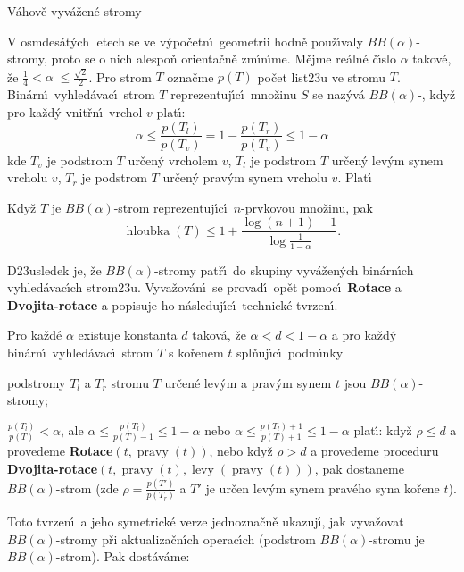 \documentclass[a4paper,12pt]{article}
\def \emph#1{\underbar{#1}}
\DeclareMathOperator*{\levy}{levy}
\DeclareMathOperator*{\pravy}{pravy}
\DeclareMathOperator*{\hloubka}{hloubka}
\begin{document}
\heading
V\'ahov\v e vyv\'a\v zen\'e stromy
\endheading

\flushpar V osmdes\'at\'ych letech se ve v\'ypo\v cetn\'\i\ geometrii 
hodn\v e pou\v z\'\i\-va\-ly $BB(\alpha )$-stromy, proto se o nich alespo\v n 
orienta\v cn\v e zm\'\i n\'\i me. M\v ejme re\'aln\'e \v c\'\i slo $
\alpha$ takov\'e, \v ze 
$\frac 14<\alpha\;\le\frac {\sqrt 2}2$. Pro strom $T$ ozna\v cme $
p(T)$ po\v cet 
list\accent23u ve stromu $T$. Bin\'arn\'\i\ vyhled\'avac\'\i\ strom $T$ 
reprezentuj\'\i c\'\i\ mno\v zinu $S$ se naz\'yv\'a $BB(\alpha )$-\emph{strom}, 
kdy\v z pro ka\v zd\'y vnit\v rn\'\i\ vrchol $v$ plat\'\i :
$$\alpha\le\frac {p(T_l)}{p (T_v)}=1-\frac {p(T_r)}{p(T_v)}\le 1-\alpha$$
kde $T_v$ je podstrom $T$ ur\v cen\'y vrcholem $v$, $T_l$ je podstrom 
$T$ ur\v cen\'y lev\'ym synem vrcholu $v$, $T_r$ je podstrom $T$ 
ur\v cen\'y prav\'ym synem vrcholu $v$. Plat\'\i


Kdy\v z $T$ je $BB(\alpha )$-strom reprezentuj\'\i c\'\i\ 
$n$-prvkovou mno\v zinu, pak 
$$\hloubka(T)\le 1+\frac {\log(n+1)-1}{\log\frac 1{1-\alpha}}.$$
\endproclaim

\flushpar D\accent23usledek je, \v ze $BB(\alpha )$-stromy pat\v r\'\i\ do 
skupiny vyv\'a\v zen\'ych bin\'arn\'\i ch vyhled\'avac\'\i ch 
stro\-m\accent23u.  Vyva\v zov\'an\'\i\ se provad\'\i\ op\v et pomoc\'\i\ 
{\bf Rotace} a {\bf Dvojita-rotace} a popisuje ho n\'asledu\-j\'\i\-c\'\i\ 
technick\'e tvrzen\'\i. 

\proclaim{Tvrzen\'\i}Pro ka\v zd\'e $\alpha$ existuje konstanta $
d$ 
takov\'a, \v ze $\alpha <d<1-\alpha$ a pro ka\v zd\'y bin\'arn\'\i\ vyhled\'avac\'\i\ 
strom $T$ s ko\v renem $t$ spl\v nuj\'\i c\'\i\ podm\'\i nky
\roster
\item
podstromy $T_l$ a $T_r$ stromu $T$ ur\v cen\'e lev\'ym a prav\'ym 
synem $t$ jsou $BB(\alpha )$-stromy;
\item
$\frac {p(T_l)}{p(T)}<\alpha$, ale $\alpha\le\frac {
p(T_l)}{p(T)-1}\le 1-\alpha$ nebo $\alpha\le\frac {
p(T_l)+1}{p(T)+1}\le 1-\alpha$
\endroster
plat\'\i :\newline 
kdy\v z $\rho\le d$ a provedeme {\bf Rotace$(t,\pravy(t))$}, nebo kdy\v z 
$\rho >d$ a provedeme proceduru {\bf Dvojita-rotace$(t,\pravy(t),\levy(\pravy(t)))$}, pak dostaneme 
$BB(\alpha )$-strom (zde $\rho =\frac {p(T')}{p(T_r
)}$ a $T'$ je ur\v cen lev\'ym synem 
prav\'e\-ho syna ko\v rene $t$).  
\endproclaim

\flushpar Toto tvrzen\'\i\ a jeho symetrick\'e verze jednozna\v cn\v e ukazuj\'\i , 
jak vyva\v zovat $BB(\alpha )$-stromy p\v ri aktualiza\v cn\'\i ch 
operac\'\i ch (podstrom $BB(\alpha )$-stromu je $BB(\alpha )$-strom). Pak dost\'av\'ame:
\end{document}
